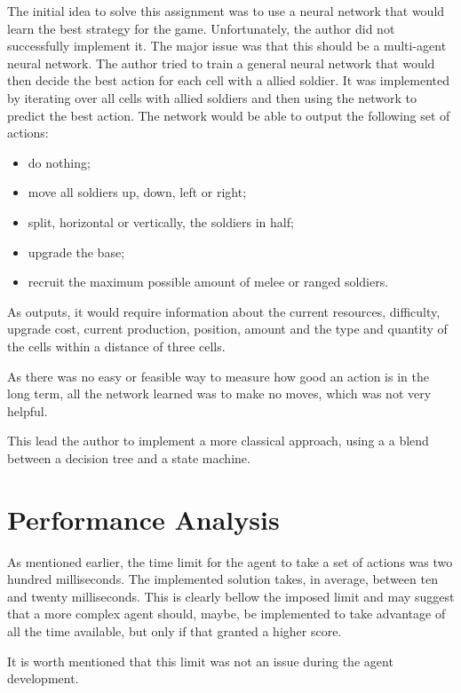 \documentclass[conference]{IEEEtran}
\begin{document}
The initial idea to solve this assignment was to use a neural network that would learn the best strategy for the game. Unfortunately, the author did not successfully implement it. The major issue was that this should be a multi-agent neural network. The author tried to train a general neural network that would then decide the best action for each cell with a allied soldier. It was implemented by iterating over all cells with allied soldiers and then using the network to predict the best action. The network would be able to output the following set of actions:

\begin{itemize}
    \item do nothing;
    \item move all soldiers up, down, left or right;
    \item split, horizontal or vertically, the soldiers in half;
    \item upgrade the base;
    \item recruit the maximum possible amount of melee or ranged soldiers.
\end{itemize}

As outputs, it would require information about the current resources, difficulty, upgrade cost, current production, position, amount and the type and quantity of the cells within a distance of three cells.

As there was no easy or feasible way to measure how good an action is in the long term, all the network learned was to make no moves, which was not very helpful.

This lead the author to implement a more classical approach, using a a blend between a decision tree and a state machine.

\section{Performance Analysis}

As mentioned earlier, the time limit for the agent to take a set of actions was two hundred milliseconds. The implemented solution takes, in average, between ten and twenty milliseconds. This is clearly bellow the imposed limit and may suggest that a more complex agent should, maybe, be implemented to take advantage of all the time available, but only if that granted a higher score.

It is worth mentioned that this limit was not an issue during the agent development.
\end{document}
